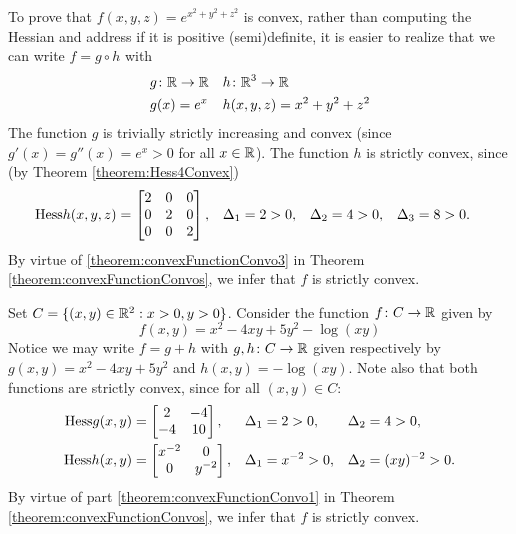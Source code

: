 \begin{example}
To prove that $f(x,y,z) = e^{x^2+y^2+z^2}$ is convex, rather than computing the Hessian and address if it is positive (semi)definite, it is easier to realize that we can write $f = g\circ h$ with 
\begin{align*}
&g \colon \mathbb{R} \to \mathbb{R} && h \colon \mathbb{R}^3 \to \mathbb{R} \\
& g(x) = e^x && h(x,y,z)=x^2+y^2+z^2
\end{align*}
The function $g$ is trivially strictly increasing and convex (since $g'(x) = g''(x) = e^x > 0$ for all $x \in \mathbb{R}$).  The function $h$ is strictly convex, since (by Theorem \ref{theorem:Hess4Convex})
\begin{align*}
\mathop{\mathrm{Hess}{h}}(x,y,z) &= \begin{bmatrix} 2 & 0 & 0 \\ 0 & 2 & 0 \\ 0 & 0 & 2 \end{bmatrix}, &\Delta_1 &=2 >0, &\Delta_2 &=4 >0, &\Delta_3 &=8 > 0.
\end{align*}
By virtue of \ref{theorem:convexFunctionConvo3} in Theorem \ref{theorem:convexFunctionConvos}, we infer that $f$ is strictly convex.
\end{example}

\begin{example}
Set $C = \{ (x,y) \in \mathbb{R}^2 : x>0, y>0 \}$.  Consider the function $f\colon C \to \mathbb{R}$ given by
\begin{equation*}
f(x,y) = x^2 -4xy+5y^2 - \log (xy)
\end{equation*}
Notice we may write $f = g+h$ with $g,h \colon C \to \mathbb{R}$ given respectively by $g(x,y) = x^2 -4xy+5y^2$ and $h(x,y) = -\log(xy)$.  Note also that both functions are strictly convex, since for all $(x,y) \in C$:
\begin{align*}
\mathop{\mathrm{Hess}{g}}(x,y) &= \begin{bmatrix} 2 & -4 \\ -4 & 10 \end{bmatrix}, &\Delta_1 &= 2 >0, & \Delta_2 &=4 >0, \\
\mathop{\mathrm{Hess}{h}}(x,y) &= \begin{bmatrix} x^{-2} & 0 \\ 0 & y^{-2} \end{bmatrix}, &\Delta_1 &= x^{-2} >0, &\Delta_2 &=(xy)^{-2} >0. 
\end{align*}
By virtue of part \ref{theorem:convexFunctionConvo1} in Theorem \ref{theorem:convexFunctionConvos}, we infer that $f$ is strictly convex.
\end{example}

